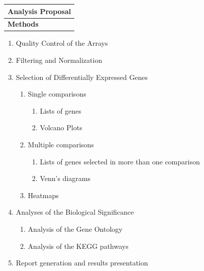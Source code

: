 \documentclass[12pt]{article}
\begin{document}
\clearpage

\begin{table}[h]
\begin{tabular}{|l|}
\hline
\rowcolor[HTML]{6F1E78} 
{\color[HTML]{FFFFFF} \textbf{Analysis Proposal} \hspace{12cm}} \\ \hline
\rowcolor[HTML]{656565} 
{\color[HTML]{FFFFFF} \textbf{Methods}} \\ \hline
\end{tabular}
\end{table}

\begin{enumerate}
 \item Quality Control of the Arrays						%
 \item Filtering and Normalization
 \item Selection of Differentially Expressed Genes
    \begin{enumerate}
     \item Single comparisons
	\begin{enumerate}
	 \item Lists of genes
	 \item Volcano Plots
	\end{enumerate}
      \item Multiple comparisons
	  \begin{enumerate}
	   \item Lists of genes selected in more than one comparison
	   \item Venn's diagrams
	  \end{enumerate}
	\item Heatmaps
    \end{enumerate}
  \item Analyses of the Biological Significance
      \begin{enumerate}
       \item Analysis of the Gene Ontology
       \item Analysis of the KEGG pathways
      \end{enumerate}
   \item Report generation and results presentation


\end{enumerate}
\end{document}
